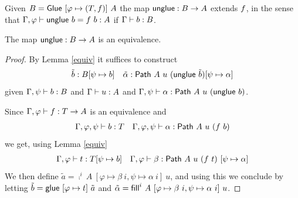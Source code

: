 Given $B = {\sf Glue}~[\varphi \mapsto (T,f{})]~A$ the map ${\sf unglue} : B
\rightarrow A$ extends $f{}$, in the sense that $\Gamma, \varphi
\vdash {\sf unglue}~b = f{}~b : A$ if $\Gamma \vdash b : B$.

\begin{theorem}\label{thm:unglueequiv}
  The map ${\sf unglue} : B \rightarrow A$ is an equivalence.
\end{theorem}

\begin{proof}
By Lemma \ref{equiv} it suffices to construct
%
\begin{align*}
  \tilde{b} : B[\psi \mapsto b] %
  &&
  \tilde{\alpha} : \Path~A~u~(\ugl~\tilde{b})[\psi \mapsto \alpha] %
\end{align*}
%
given $\Gamma, \psi \vdash b : B$ and $\Gamma\vdash u:A$ and
$\Gamma, \psi \vdash \alpha : {\sf Path}~A~u~({\sf unglue}~b)$.

Since $\Gamma, \varphi \vdash f{} : T \rightarrow A$ is an
equivalence and
%
\begin{align*}
  \Gamma,\varphi,\psi \der b : T %
  &&
  \Gamma,\varphi,\psi \der \alpha:\Path~A~u~(f~b) %
\end{align*}
we get, using Lemma \ref{equiv}
%
\begin{align*}
  \Gamma,\varphi \der t : T[\psi \mapsto b] %
  &&
  \Gamma,\varphi \der \beta : \Path~A~u~(\myeq{}~t)~[\psi \mapsto \alpha] %
\end{align*}
We then define
$\tilde{a} = \comp^i~A~[\varphi \mapsto \beta~i,\psi \mapsto \alpha~i]~u$,
and using this we conclude by letting
$\tilde{b} = {\sf glue}~[\varphi \mapsto t]~\tilde{a}$ and
$\tilde{\alpha} = {\sf fill}^i~A~[\varphi \mapsto \beta~i, \psi \mapsto \alpha~i]~u$.
\end{proof}

